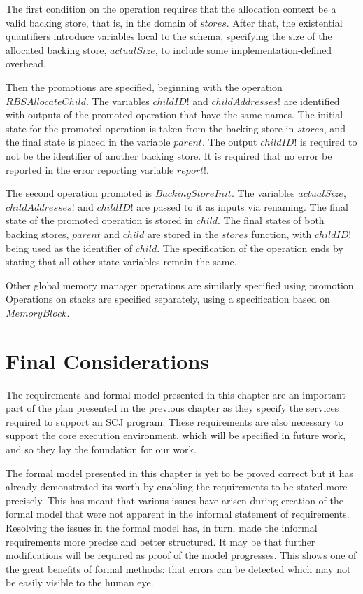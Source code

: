 \documentclass[a4paper,10pt]{report}
\begin{document}
The first condition on the operation requires that the allocation
context be a valid backing store, that is, in the domain of $stores$.
After that, the existential quantifiers introduce variables local to
the schema, specifying the size of the allocated backing store,
$actualSize$, to include some implementation-defined overhead.

Then the promotions are specified, beginning with the operation
$RBSAllocateChild$.
The variables $childID!$ and $childAddresses!$ are identified with
outputs of the promoted operation that have the same names.
The initial state for the promoted operation is taken from the backing
store in $stores$, and the final state is placed in the variable
$parent$.
The output $childID!$ is required to not be the identifier of another
backing store.
It is required that no error be reported in the error reporting
variable $report!$.

The second operation promoted is $BackingStoreInit$.
The variables $actualSize$, $childAddresses!$ and $childID!$ are
passed to it as inputs via renaming.
The final state of the promoted operation is stored in $child$.
The final states of both backing stores, $parent$ and $child$ are
stored in the $stores$ function, with $childID!$ being used as the
identifier of $child$.
The specification of the operation ends by stating that all other
state variables remain the same.

Other global memory manager operations are similarly specified using
promotion.
Operations on stacks are specified separately, using a specification
based on $MemoryBlock$.

\section{Final Considerations}

The requirements and formal model presented in this chapter are an
important part of the plan presented in the previous chapter as they
specify the services required to support an SCJ program.
These requirements are also necessary to support the core execution
environment, which will be specified in future work, and so they lay
the foundation for our work.

The formal model presented in this chapter is yet to be proved correct
but it has already demonstrated its worth by enabling the requirements
to be stated more precisely.
This has meant that various issues have arisen during creation of the
formal model that were not apparent in the informal statement of
requirements.
Resolving the issues in the formal model has, in turn, made the
informal requirements more precise and better structured.
It may be that further modifications will be required as proof of the
model progresses.
This shows one of the great benefits of formal methods: that errors
can be detected which may not be easily visible to the human eye.
\end{document}

